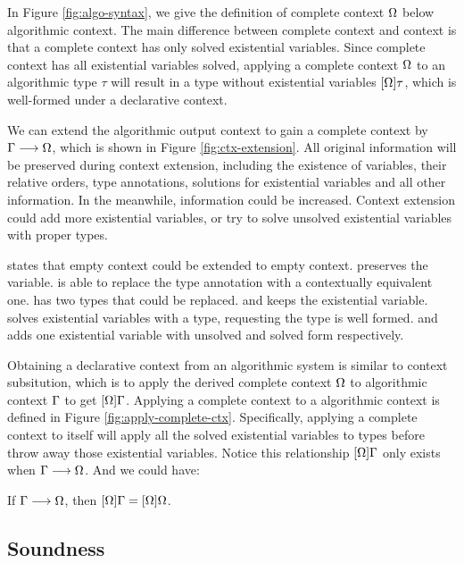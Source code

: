 In Figure \ref{fig:algo-syntax}, we give the definition of complete context $\Omega$ below algorithmic context. The main difference between complete context and context is that a complete context has only solved existential variables. Since complete context has all existential variables solved, applying a complete context $\Omega$ to an algorithmic type $\tau$ will result in a type without existential variables $[\Omega]\tau$, which is well-formed under a declarative context.

We can extend the algorithmic output context to gain a complete context by $\Gamma \longrightarrow \Omega$, which is shown in Figure \ref{fig:ctx-extension}. All original information will be preserved during context extension, including the existence of variables, their relative orders, type annotations, solutions for existential variables and all other information. In the meanwhile, information could be increased. Context extension could add more existential variables, or try to solve unsolved existential variables with proper types.

 states that empty context could be extended to empty context.  preserves the variable.  is able to replace the type annotation with a contextually equivalent one.  has two types that could be replaced.  and  keeps the existential variable.  solves existential variables with a type, requesting the type is well formed.  and  adds one existential variable with unsolved and solved form respectively.

Obtaining a declarative context from an algorithmic system is similar to context subsitution, which is to apply the derived complete context $\Omega$ to algorithmic context $\Gamma$ to get $[\Omega]\Gamma$. Applying a complete context to a algorithmic context is defined in Figure \ref{fig:apply-complete-ctx}. Specifically, applying a complete context to itself will apply all the solved existential variables to types before throw away those existential variables. Notice this relationship $[\Omega]\Gamma$ only exists when $\Gamma \longrightarrow \Omega$. And we could have:

\begin{lemma}
  \label{lemma:stability-of-complete-context}

  If $\Gamma \longrightarrow \Omega$, then $[\Omega]\Gamma = [\Omega]\Omega$.
\end{lemma}

\subsection{Soundness}

